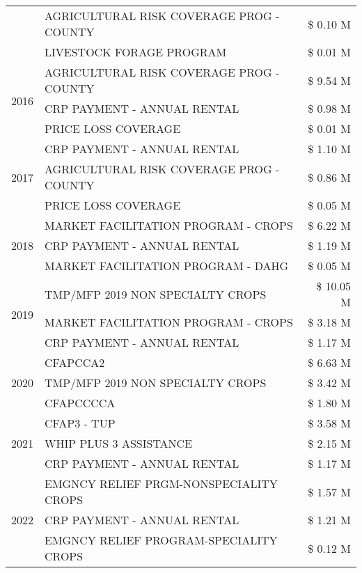 \begin{tabular}{llr}
 & AGRICULTURAL RISK COVERAGE PROG - COUNTY & \$ 0.10 M \\
 & LIVESTOCK FORAGE PROGRAM & \$ 0.01 M \\
\cline{1-3}
\multirow[t]{3}{*}{2016} & AGRICULTURAL RISK COVERAGE PROG - COUNTY & \$ 9.54 M \\
 & CRP PAYMENT - ANNUAL RENTAL & \$ 0.98 M \\
 & PRICE LOSS COVERAGE & \$ 0.01 M \\
\cline{1-3}
\multirow[t]{3}{*}{2017} & CRP PAYMENT - ANNUAL RENTAL & \$ 1.10 M \\
 & AGRICULTURAL RISK COVERAGE PROG - COUNTY & \$ 0.86 M \\
 & PRICE LOSS COVERAGE & \$ 0.05 M \\
\cline{1-3}
\multirow[t]{3}{*}{2018} & MARKET FACILITATION PROGRAM - CROPS & \$ 6.22 M \\
 & CRP PAYMENT - ANNUAL RENTAL & \$ 1.19 M \\
 & MARKET FACILITATION PROGRAM - DAHG & \$ 0.05 M \\
\cline{1-3}
\multirow[t]{3}{*}{2019} & TMP/MFP 2019 NON SPECIALTY CROPS & \$ 10.05 M \\
 & MARKET FACILITATION PROGRAM - CROPS & \$ 3.18 M \\
 & CRP PAYMENT - ANNUAL RENTAL & \$ 1.17 M \\
\cline{1-3}
\multirow[t]{3}{*}{2020} & CFAPCCA2 & \$ 6.63 M \\
 & TMP/MFP 2019 NON SPECIALTY CROPS & \$ 3.42 M \\
 & CFAPCCCCA & \$ 1.80 M \\
\cline{1-3}
\multirow[t]{3}{*}{2021} & CFAP3 - TUP & \$ 3.58 M \\
 & WHIP PLUS 3 ASSISTANCE & \$ 2.15 M \\
 & CRP PAYMENT - ANNUAL RENTAL & \$ 1.17 M \\
\cline{1-3}
\multirow[t]{3}{*}{2022} & EMGNCY RELIEF PRGM-NONSPECIALITY CROPS & \$ 1.57 M \\
 & CRP PAYMENT - ANNUAL RENTAL & \$ 1.21 M \\
 & EMGNCY RELIEF PROGRAM-SPECIALITY CROPS & \$ 0.12 M \\
\cline{1-3}
\bottomrule
\end{tabular}
